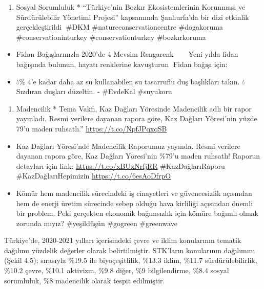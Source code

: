 \documentclass[
]{book}
\providecommand{\tightlist}{%
  \setlength{\itemsep}{0pt}\setlength{\parskip}{0pt}}
\begin{document}
\begin{enumerate}
\def\labelenumi{\arabic{enumi})}
\setcounter{enumi}{7}
\tightlist
\item
  Sosyal Sorumluluk * ``Türkiye'nin Bozkır Ekosistemlerinin Korunması ve Sürdürülebilir Yönetimi Projesi'' kapsamında Şanlıurfa'da bir dizi etkinlik gerçekleştirildi🌾 \citet{faoturkiye} \citet{FAO} \citet{theGEF} \#DKM \#natureconservationcentre \#dogakoruma \#conservationinturkey \#conservationturkey \#bozkırkoruma
\end{enumerate}

\begin{itemize}
\item
  Fidan Bağışlarınızla 2020'de 4 Mevsim Rengarenk🌳🐝 🐠🌷🦋 Yeni yılda fidan bağışında bulunun, hayatı renklerine kavuşturun🌈 Fidan bağışı için:
\item
  💧\% 4'e kadar daha az su kullanabilen su tasarruflu duş başlıkları takın. 💧Sızdıran duşları düzeltin. - \#EvdeKal \#suyukoru
\end{itemize}

\begin{enumerate}
\def\labelenumi{\arabic{enumi})}
\setcounter{enumi}{8}
\tightlist
\item
  Madencilik * Tema Vakfı, Kaz Dağları Yöresinde Madencilik adlı bir rapor yayınladı. Resmi verilere dayanan rapora göre, Kaz Dağları Yöresi'nin yüzde 79'u maden ruhsatlı.'' \url{https://t.co/NpfJPqxqSB}
\end{enumerate}

\begin{itemize}
\item
  Kaz Dağları Yöresi'nde Madencilik Raporumuz yayında. Resmi verilere dayanan rapora göre, Kaz Dağları Yöresi'nin \%79'u maden ruhsatlı! Raporun detayları için link: \url{https://t.co/xBUxNrfjRR} \#KazDağlarıRaporu \#KazDağlarıHepimizin \url{https://t.co/6esAoDfrpO}
\item
  Kömür hem madencilik sürecindeki iş cinayetleri ve güvencesizlik açısından hem de enerji üretim sürecinde sebep olduğu hava kirliliği açısından önemli bir problem. Peki gerçekten ekonomik bağımsızlık için kömüre bağımlı olmak zorunda mıyız? \#yeşildüşün \#gogreen \#greenwave
\end{itemize}

Türkiye'de, 2020-2021 yılları içerisindeki çevre ve iklim konularının tematik dağılımı yüzdelik değerler olarak belirtilmiştir. STK'ların konularının dağılımını (Şekil 4.5); sırasıyla \%19.5 ile biyoçeşitlilik, \%13.3 iklim, \%11.7 sürdürülebilirlik, \%10.2 çevre, \%10.1 aktivizm, \%9.8 diğer, \%9 bilgilendirme, \%8.4 sosyal sorumluluk, \%8 madencilik olarak tespit edilmiştir.
\end{document}
